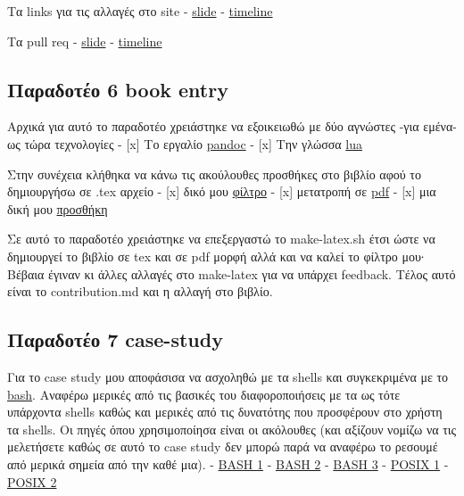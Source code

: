 \documentclass[
]{article}
\begin{document}
Τα links για τις αλλαγές στο site -
\href{https://stitc-site.netlify.app/slides/os/}{slide} -
\href{https://jazzy-khapse-290902.netlify.app/timeline/os-apps/}{timeline}

Τα pull req -
\href{https://github.com/Second-Time-Is-The-Charm/site/pull/7}{slide} -
\href{https://github.com/Second-Time-Is-The-Charm/site/pull/9}{timeline}

\hypertarget{ux3c0ux3b1ux3c1ux3b1ux3b4ux3bfux3c4ux3adux3bf-6-book-entry}{%
\subsection{Παραδοτέο 6 \textbar{} book
entry}\label{ux3c0ux3b1ux3c1ux3b1ux3b4ux3bfux3c4ux3adux3bf-6-book-entry}}

Αρχικά για αυτό το παραδοτέο χρειάστηκε να εξοικειωθώ με δύο αγνώστες
-για εμένα- ως τώρα τεχνολογίες - {[}x{]} Το εργαλίο
\href{https://pandoc.org/}{pandoc} - {[}x{]} Την γλώσσα
\href{https://www.lua.org/}{lua}

Στην συνέχεια κλήθηκα να κάνω τις ακούλουθες προσθήκες στο βιβλίο αφού
το δημιουργήσω σε .tex αρχείο - {[}x{]} δικό μου
\href{https://github.com/Angeloth1/kallipos/blob/master/contribution.lua}{φίλτρο}
- {[}x{]} μετατροπή σε
\href{https://github.com/Angeloth1/kallipos/blob/master/book/book.pdf}{pdf}
- {[}x{]} μια δική μου
\href{https://github.com/Angeloth1/kallipos/blob/master/contribution/unixLin.md}{προσθήκη}

Σε αυτό το παραδοτέο χρειάστηκε να επεξεργαστώ το make-latex.sh έτσι
ώστε να δημιουργεί το βιβλίο σε tex και σε pdf μορφή αλλά και να καλεί
το φίλτρο μου∙ Βέβαια έγιναν κι άλλες αλλαγές στο make-latex για να
υπάρχει feedback. Τέλος αυτό είναι το contribution.md και η αλλαγή στο
βιβλίο.

\hypertarget{ux3c0ux3b1ux3c1ux3b1ux3b4ux3bfux3c4ux3adux3bf-7-case-study}{%
\subsection{Παραδοτέο 7 \textbar{}
case-study}\label{ux3c0ux3b1ux3c1ux3b1ux3b4ux3bfux3c4ux3adux3bf-7-case-study}}

Για το case study μου αποφάσισα να ασχοληθώ με τα shells και
συγκεκριμένα με το \href{https://www.gnu.org/software/bash/}{bash}.
Αναφέρω μερικές από τις βασικές του διαφοροποιήσεις με τα ως τότε
υπάρχοντα shells καθώς και μερικές από τις δυνατότης που προσφέρουν στο
χρήστη τα shells. Οι πηγές όπου χρησιμοποίησα είναι οι ακόλουθες (και
αξίζουν νομίζω να τις μελετήσετε καθώς σε αυτό το case study δεν μπορώ
παρά να αναφέρω το ρεσουμέ από μερικά σημεία από την καθέ μια). -
\href{http://bashcookbook.com/bashinfo/source/bash-4.0/doc/rose94.pdf}{BASH
1} -
\href{https://books.google.gr/books?hl=el\&lr=\&id=dzBCH3x6fYEC\&oi=fnd\&pg=PT7\&dq=bash+shell\&ots=iXl_zalwFU\&sig=Z-EfIYMoAn-QBjrJOzt_x97YQy8\&redir_esc=y\#v=onepage\&q\&f=false}{BASH
2} - \href{https://en.wikipedia.org/wiki/Bash_(Unix_shell)}{BASH 3} -
\href{https://en.wikipedia.org/wiki/POSIX}{POSIX 1} -
\href{https://itsfoss.com/posix/}{POSIX 2}
\end{document}
